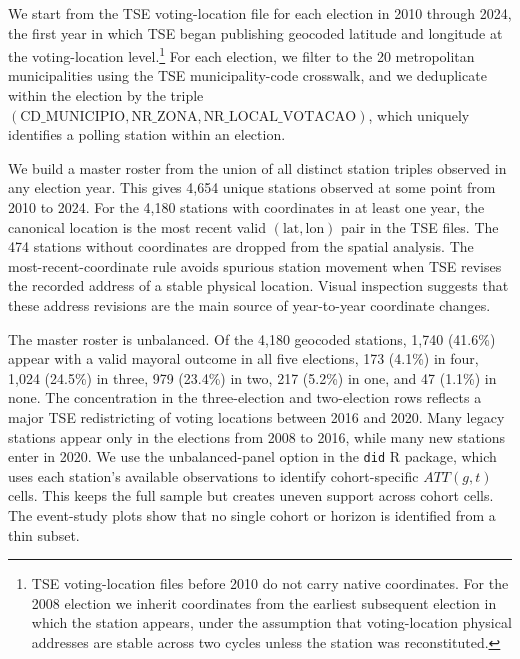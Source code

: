 \documentclass[11pt]{article}
\begin{document}
We start from the TSE voting-location file for each election in 2010 through 2024, the first year in which TSE began publishing geocoded latitude and longitude at the voting-location level.\footnote{TSE voting-location files before 2010 do not carry native coordinates. For the 2008 election we inherit coordinates from the earliest subsequent election in which the station appears, under the assumption that voting-location physical addresses are stable across two cycles unless the station was reconstituted.} For each election, we filter to the 20 metropolitan municipalities using the TSE municipality-code crosswalk, and we deduplicate within the election by the triple $(\text{CD\_MUNICIPIO}, \text{NR\_ZONA}, \text{NR\_LOCAL\_VOTACAO})$, which uniquely identifies a polling station within an election.

We build a master roster from the union of all distinct station triples observed in any election year. This gives 4,654 unique stations observed at some point from 2010 to 2024. For the 4,180 stations with coordinates in at least one year, the canonical location is the most recent valid $(\text{lat}, \text{lon})$ pair in the TSE files. The 474 stations without coordinates are dropped from the spatial analysis. The most-recent-coordinate rule avoids spurious station movement when TSE revises the recorded address of a stable physical location. Visual inspection suggests that these address revisions are the main source of year-to-year coordinate changes.

The master roster is unbalanced. Of the 4,180 geocoded stations, 1,740 (41.6\%) appear with a valid mayoral outcome in all five elections, 173 (4.1\%) in four, 1,024 (24.5\%) in three, 979 (23.4\%) in two, 217 (5.2\%) in one, and 47 (1.1\%) in none. The concentration in the three-election and two-election rows reflects a major TSE redistricting of voting locations between 2016 and 2020. Many legacy stations appear only in the elections from 2008 to 2016, while many new stations enter in 2020. We use the unbalanced-panel option in the \texttt{did} R package, which uses each station's available observations to identify cohort-specific $ATT(g,t)$ cells. This keeps the full sample but creates uneven support across cohort cells. The event-study plots show that no single cohort or horizon is identified from a thin subset.
\end{document}
